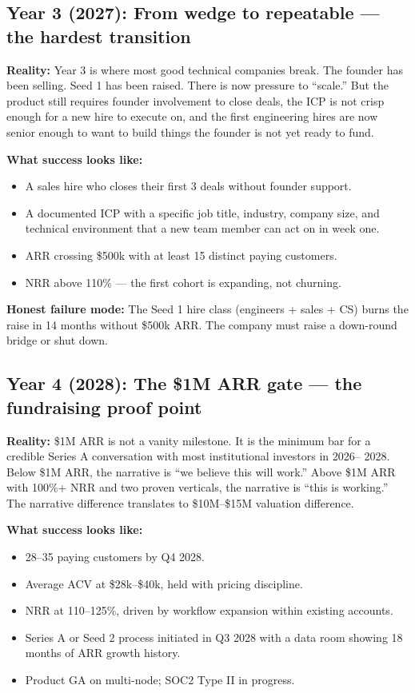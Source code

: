 \subsection{Year 3 (2027): From wedge to repeatable --- the hardest transition}

\textbf{Reality:} Year 3 is where most good technical companies break. The
founder has been selling. Seed 1 has been raised. There is now pressure to
``scale.'' But the product still requires founder involvement to close deals,
the ICP is not crisp enough for a new hire to execute on, and the first
engineering hires are now senior enough to want to build things the founder is
not yet ready to fund.

\textbf{What success looks like:}
\begin{itemize}[leftmargin=1.5em,itemsep=2pt]
  \item A sales hire who closes their first 3 deals without founder support.
  \item A documented ICP with a specific job title, industry, company size, and
        technical environment that a new team member can act on in week one.
  \item ARR crossing \$500k with at least 15 distinct paying customers.
  \item NRR above 110\% — the first cohort is expanding, not churning.
\end{itemize}

\textbf{Honest failure mode:} The Seed 1 hire class (engineers + sales + CS)
burns the raise in 14 months without \$500k ARR. The company must raise a
down-round bridge or shut down.

\subsection{Year 4 (2028): The \$1M ARR gate --- the fundraising proof point}

\textbf{Reality:} \$1M ARR is not a vanity milestone. It is the minimum bar
for a credible Series A conversation with most institutional investors in 2026--
2028. Below \$1M ARR, the narrative is ``we believe this will work.'' Above
\$1M ARR with 100\%+ NRR and two proven verticals, the narrative is ``this is
working.'' The narrative difference translates to \$10M--\$15M valuation
difference.

\textbf{What success looks like:}
\begin{itemize}[leftmargin=1.5em,itemsep=2pt]
  \item 28--35 paying customers by Q4 2028.
  \item Average ACV at \$28k--\$40k, held with pricing discipline.
  \item NRR at 110--125\%, driven by workflow expansion within existing accounts.
  \item Series A or Seed 2 process initiated in Q3 2028 with a data room
        showing 18 months of ARR growth history.
  \item Product GA on multi-node; SOC2 Type II in progress.
\end{itemize}

